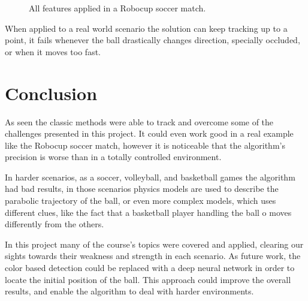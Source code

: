 \documentclass[10pt,twocolumn,letterpaper]{article}
\begin{document}
\begin{figure}[!h]
\centering
\setlength{\fboxsep}{1pt}
\setlength{\fboxrule}{1pt}
\caption{All features applied in a Robocup soccer match.}\label{fig:robocup_1}
\end{figure}

When applied to a real world scenario the solution can keep tracking up to a
point, it fails whenever the ball drastically changes direction, specially
occluded, or when it moves too fast.

\section{Conclusion}\label{sec:conclusion}

As seen the classic methods were able to track and overcome some of the
challenges presented in this project. It could even work good in a real example like the Robocup soccer match, however it is noticeable that the algorithm's precision is worse than in a totally controlled environment.

In harder scenarios, as a soccer, volleyball, and basketball games the algorithm had  bad results, in those scenarios physics models are used to describe the parabolic trajectory of the ball, or even  more complex models, which uses different clues, like the fact that a basketball player handling the ball o moves differently from the others.

In this project  many of the course's topics were covered and applied, clearing our sights towards their weakness and strength in each scenario. As future work, the color based detection could be replaced with a deep neural network in order to locate the initial position of the ball. This approach could improve the overall results, and enable the algorithm to deal with harder environments.

{\small


}
\end{document}
